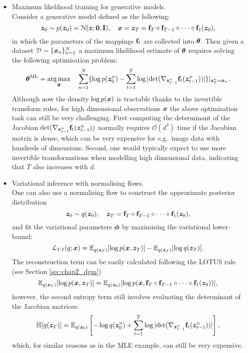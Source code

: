 \begin{itemize}
\item Maximum likelihood training for generative models. \\
Consider a generative model defined as the following:
$$\bm{z}_0 \sim p(\bm{z}_0) = \mathcal{N}(\bm{z}; \bm{0}, \mathbf{I}), \quad \bm{x} = \bm{z}_T = \mathbf{f}_{T} \circ \mathbf{f}_{T-1} \circ \cdot \cdot \cdot \circ \mathbf{f}_{1} (\bm{z}_0),$$
in which the parameters of the mappings $\mathbf{f}_t$ are collected into $\bm{\theta}$. Then given a dataset $\mathcal{D} = \{\bm{x}_n \}_{n=1}^N$ a maximum likelihood estimate of $\bm{\theta}$ requires solving the following optimisation problem:
\begin{equation}
\bm{\theta}^{\text{ML}} = \operatorname*{arg\,max}_{\bm{\theta}} \quad \sum_{n=1}^N \{ \log p(\bm{z}_0^n) - \sum_{t=1}^T \log | \text{det}(\nabla_{\bm{z}_{t-1}^n} \mathbf{f}_t(\bm{z}_{t-1}^n)) | \} |_{\bm{z}^n_T = \bm{x}_n}.
\end{equation}
Although now the density $\log p(\bm{x})$ is tractable thanks to the invertible transform rules, for high dimensional observations $\bm{x}$ the above optimisation task can still be very challenging. First computing the determinant of the Jacobian $\text{det}(\nabla_{\bm{z}_{t-1}^n} \mathbf{f}_t(\bm{z}_{t-1}^n))$ normally requires $\mathcal{O}(d^3)$ time if the Jacobian matrix is dense, which can be very expensive for e.g.~image data with hundreds of dimensions. Second, one would typically expect to use more invertible transformations when modelling high dimensional data, indicating that $T$ also increases with $d$. 
%
\item Variational inference with normalising flows. \\
One can also use a normalising flow to construct the approximate posterior distribution
$$\bm{z}_0 \sim q(\bm{z}_0), \quad \bm{z}_T = \mathbf{f}_{T} \circ \mathbf{f}_{T-1} \circ \cdot \cdot \cdot \circ \mathbf{f}_{1} (\bm{z}_0),$$
and fit the variational parameters $\bm{\phi}$ by maximising the variational lower-bound:
\begin{equation}
\mathcal{L}_{VI}(q; \bm{x}) = \mathbb{E}_{q(\bm{z}_T)}[ \log p(\bm{x}, \bm{z}_T) ] - \mathbb{E}_{q(\bm{z}_T)}[\log q(\bm{z}_T)].  
\end{equation}
The reconstruction term can be easily calculated following the LOTUS rule (see Section \ref{sec:chap2_dgm})
$$  \mathbb{E}_{q(\bm{z}_T)}[ \log p(\bm{x}, \bm{z}_T) ] =  \mathbb{E}_{q(\bm{z}_0)}[ \log p(\bm{x},  \mathbf{f}_{T} \circ \mathbf{f}_{T-1} \circ \cdot \cdot \cdot \circ \mathbf{f}_{1} (\bm{z}_0)) ],$$
however, the second entropy term still involves evaluating the determinant of the Jacobian matrices:
$$\mathbb{H}[q(\bm{z}_T)] = \mathbb{E}_{q(\bm{z}_0)} \left[ - \log q(\bm{z}_0^n) + \sum_{t=1}^T \log | \text{det}(\nabla_{\bm{z}_{t-1}^n} \mathbf{f}_t(\bm{z}_{t-1}^n)) | \right],$$
which, for similar reasons as in the MLE example, can still be very expensive.
\end{itemize}

